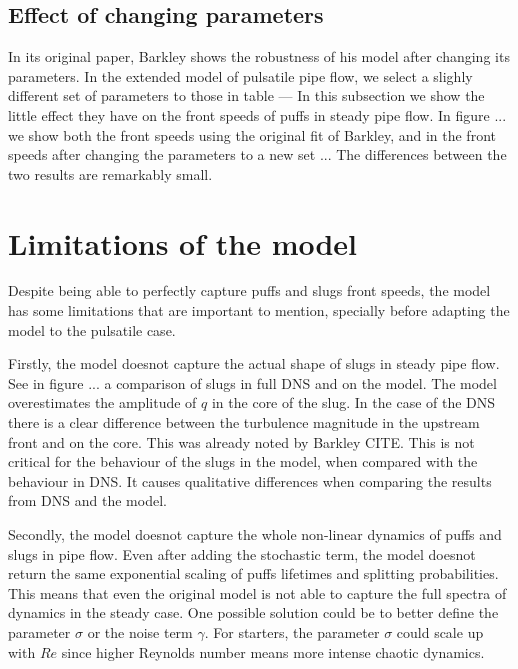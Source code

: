 \documentclass{article}
\begin{document}
\subsection{Effect of changing parameters}
In its original paper, Barkley shows the robustness of his model after changing its parameters. In the extended model of pulsatile pipe flow, we select a slighly different set of parameters to those in table --- In this subsection we show the little effect they have on the front speeds of puffs in steady pipe flow. In figure ... we show both the front speeds using the original fit of Barkley, and in the front speeds after changing the parameters to a new set ... The differences between the two results are remarkably small.



\section{Limitations of the model}
Despite being able to perfectly capture puffs and slugs front speeds, the model has some limitations that are important to mention, specially before adapting the model to the pulsatile case.

Firstly, the model doesnot capture the actual shape of slugs in steady pipe flow. See in figure ... a comparison of slugs in full DNS and on the model. The model overestimates the amplitude of $q$ in the core of the slug. In the case of the DNS there is a clear difference between the turbulence magnitude in the upstream front and on the core. This was already noted by Barkley CITE. This is not critical for the behaviour of the slugs in the model, when compared with the behaviour in DNS. It causes qualitative differences when comparing the results from DNS and the model. 

Secondly, the model doesnot capture the whole non-linear dynamics of puffs and slugs in pipe flow. Even after adding the stochastic term, the model doesnot return the same exponential scaling of puffs lifetimes and splitting probabilities. This means that even the original model is not able to capture the full spectra of dynamics in the steady case. One possible solution could be to better define the parameter $\sigma$ or the noise term $\gamma$. For starters, the parameter $\sigma$ could scale up with $Re$ since higher Reynolds number means more intense chaotic dynamics.
\end{document}
